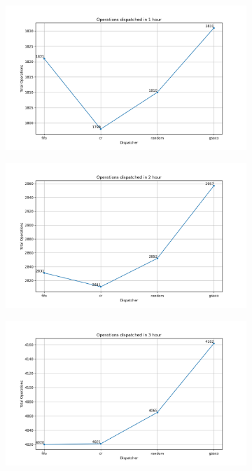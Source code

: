 \begin{figure}[t]
	\centering
	\begin{subfigure}{0.32\textwidth}
		\includegraphics[width=\textwidth]{HVLM/total_operations_3600s.png}
		\caption{}
		\label{fig:o1}
	\end{subfigure}\hfill
	\begin{subfigure}{0.32\textwidth}
		\includegraphics[width=\textwidth]{HVLM/total_operations_7200s.png}
		\caption{}
		\label{fig:o2}
	\end{subfigure}\hfill
	\begin{subfigure}{0.32\textwidth}
		\includegraphics[width=\textwidth]{HVLM/total_operations_10800s.png}

\end{subfigure}
\end{figure}
